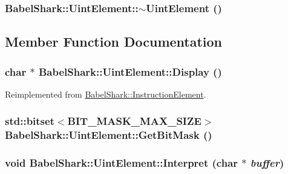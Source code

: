 \hypertarget{class_babel_shark_1_1_uint_element_c298866a90094639668c65602190c6fa}{
\subsubsection[{$\sim$UintElement}]{\setlength{\rightskip}{0pt plus 5cm}BabelShark::UintElement::$\sim$UintElement ()}}
\label{class_babel_shark_1_1_uint_element_c298866a90094639668c65602190c6fa}




\subsection{Member Function Documentation}
\hypertarget{class_babel_shark_1_1_uint_element_06162488c1a349e17d165d038e5cd646}{
\subsubsection[{Display}]{\setlength{\rightskip}{0pt plus 5cm}char $\ast$ BabelShark::UintElement::Display ()}}
\label{class_babel_shark_1_1_uint_element_06162488c1a349e17d165d038e5cd646}




Reimplemented from \hyperlink{class_babel_shark_1_1_instruction_element_6c98ad187a2a12399eb90a8cf9e2aec0}{BabelShark::InstructionElement}.\hypertarget{class_babel_shark_1_1_uint_element_f81423a50db5341b3dd745089203269f}{
\subsubsection[{GetBitMask}]{\setlength{\rightskip}{0pt plus 5cm}std::bitset$<$BIT\_\-MASK\_\-MAX\_\-SIZE$>$ BabelShark::UintElement::GetBitMask ()}}
\label{class_babel_shark_1_1_uint_element_f81423a50db5341b3dd745089203269f}


\hypertarget{class_babel_shark_1_1_uint_element_61c83ce006915d71961667032f77b6db}{
\subsubsection[{Interpret}]{\setlength{\rightskip}{0pt plus 5cm}void BabelShark::UintElement::Interpret (char $\ast$ {\em buffer})}}
\label{class_babel_shark_1_1_uint_element_61c83ce006915d71961667032f77b6db}




